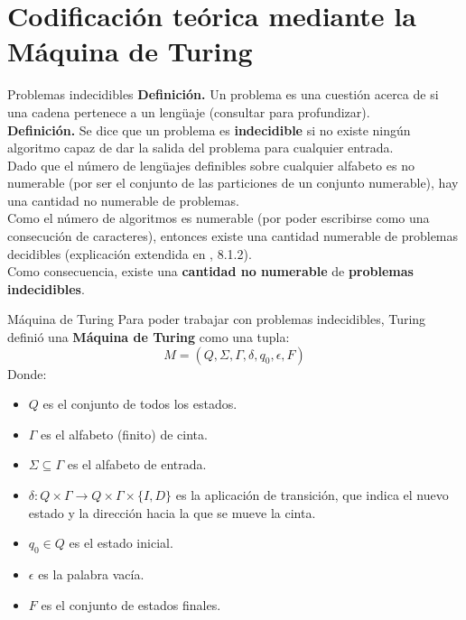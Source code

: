 \documentclass[aspectratio=169]{beamer}
\begin{document}
\section{Codificación teórica mediante la Máquina de Turing}
\begin{frame}{Problemas indecidibles}
	\textbf{Definición.} Un problema es una cuestión acerca de si una cadena pertenece a un lengüaje (consultar \cite{vazquez2022introduccion} para profundizar).\\\vspace{12pt}
	\textbf{Definición.} Se dice que un problema es \textbf{indecidible} si no existe ningún algoritmo capaz de dar la salida del problema para cualquier entrada.\\\vspace{12pt}
	Dado que el número de lengüajes definibles sobre cualquier alfabeto es no numerable (por ser el conjunto de las particiones de un conjunto numerable), hay una cantidad no numerable de problemas.\\
	Como el número de algoritmos es numerable (por poder escribirse como una consecución de caracteres), entonces existe una cantidad numerable de problemas decidibles (explicación extendida en \cite{vazquez2022introduccion}, 8.1.2).\\\vspace{12pt}
	Como consecuencia, existe una \textbf{cantidad no numerable} de \textbf{problemas indecidibles}.
\end{frame}

\begin{frame}{Máquina de Turing}
Para poder trabajar con problemas indecidibles, Turing definió una \textbf{Máquina de Turing }como una tupla:
$$M = (Q, \Sigma, \Gamma, \delta, q_0, \epsilon, F)$$
Donde:
\begin{itemize}
	\item $Q$ es el conjunto de todos los estados.\pause
	\item $\Gamma$ es el alfabeto (finito) de cinta.\pause
	\item $\Sigma\subseteq\Gamma$ es el alfabeto de entrada.\pause
	\item $\delta:Q\times \Gamma \rightarrow Q\times \Gamma \times \{I, D\}$ es la aplicación de transición, que indica el nuevo estado y la dirección hacia la que se mueve la cinta.\pause
	\item $q_0\in Q$ es el estado inicial.\pause
	\item $\epsilon$ es la palabra vacía.\pause
	\item $F$ es el conjunto de estados finales.	\pause
\end{itemize}

\end{frame}
\end{document}
